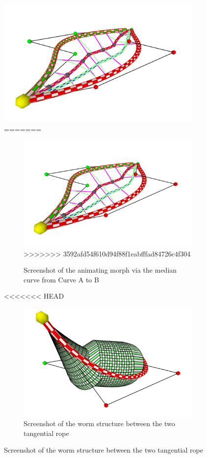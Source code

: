 \documentclass[twoside,11pt]{article}
\begin{document}
\begin{figure} [H]
    \centering
    \includegraphics[width=04in]{ssAnim.png}
=======



\begin{figure} [t]
    \centering
    \includegraphics[width=06in]{ssAnim.png}
>>>>>>> 3592afd54f610d94f88f1eabfffad84726c4f304
    \caption{Screenshot of the animating morph via the median curve from Curve A to B}
\end{figure}



<<<<<<< HEAD
\begin{figure} [H]
    \centering
    \includegraphics[width=04in]{wormFull.png}
    \caption{Screenshot of the worm structure between the two tangential rope}
\end{figure}


\end{figure}
\end{document}
